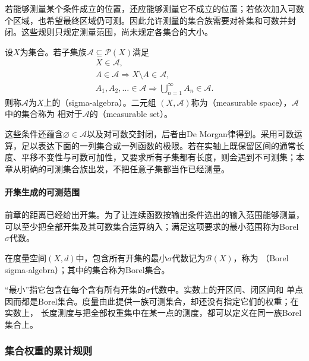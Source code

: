 若能够测量某个条件成立的位置，还应能够测量它不成立的位置；若依次加入可数个区域，也希望最终区域仍可测。因此允许测量的集合族需要对补集和可数并封闭。这些规则只规定测量范围，尚未规定各集合的大小。

\begin{definition}
\label{def:analysis-sigma-algebra}
设$X$为集合。若子集族$\mathcal{A}\subseteq\mathcal{P}(X)$满足
\[
  \begin{gathered}
    X\in\mathcal{A},\\
    A\in\mathcal{A}\Longrightarrow X\setminus A\in\mathcal{A},\\
    A_1,A_2,\ldots\in\mathcal{A}
    \Longrightarrow\bigcup_{n=1}^{\infty}A_n\in\mathcal{A}.
  \end{gathered}
\]
则称$\mathcal{A}$为$X$上的（sigma-algebra）。二元组
$(X,\mathcal{A})$称为（measurable space），$\mathcal{A}$中的集合称为
相对于$\mathcal{A}$的（measurable set）。
\end{definition}

这些条件还蕴含$\varnothing\in\mathcal A$以及对可数交封闭，后者由De Morgan律得到。采用可数运算，足以表达下面的一列集合或一列函数的极限。若在实轴上既保留区间的通常长度、平移不变性与可数可加性，又要求所有子集都有长度，则会遇到不可测集；本章从明确的可测集合族出发，不把任意子集都当作已经测量。

\paragraph{开集生成的可测范围}

前章的距离已经给出开集。为了让连续函数按输出条件选出的输入范围能够测量，可以至少把全部开集及其可数集合运算纳入；满足这项要求的最小范围称为Borel $\sigma$代数。

\begin{definition}
\label{def:analysis-borel-sigma-algebra}
在度量空间$(X,d)$中，包含所有开集的最小$\sigma$代数记为$\mathcal{B}(X)$，称为
（Borel sigma-algebra）；其中的集合称为Borel集合。
\end{definition}
“最小”指它包含在每个含有所有开集的$\sigma$代数中。实数上的开区间、闭区间和
单点因而都是Borel集合。度量由此提供一族可测集合，却还没有指定它们的权重；在实数上，
长度测度与把全部权重集中在某一点的测度，都可以定义在同一族Borel集合上。

\subsubsection{集合权重的累计规则}
